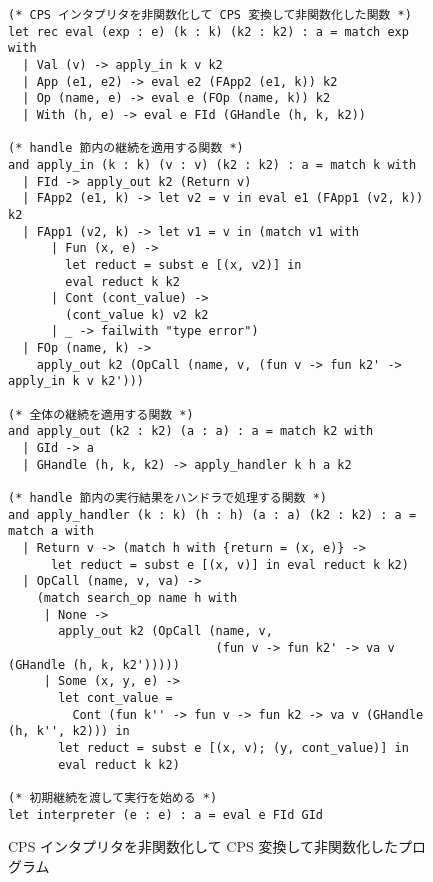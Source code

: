 \begin{figure}
\begin{verbatim}
(* CPS インタプリタを非関数化して CPS 変換して非関数化した関数 *)
let rec eval (exp : e) (k : k) (k2 : k2) : a = match exp with
  | Val (v) -> apply_in k v k2
  | App (e1, e2) -> eval e2 (FApp2 (e1, k)) k2
  | Op (name, e) -> eval e (FOp (name, k)) k2
  | With (h, e) -> eval e FId (GHandle (h, k, k2))

(* handle 節内の継続を適用する関数 *)
and apply_in (k : k) (v : v) (k2 : k2) : a = match k with
  | FId -> apply_out k2 (Return v)
  | FApp2 (e1, k) -> let v2 = v in eval e1 (FApp1 (v2, k)) k2
  | FApp1 (v2, k) -> let v1 = v in (match v1 with
      | Fun (x, e) ->
        let reduct = subst e [(x, v2)] in
        eval reduct k k2
      | Cont (cont_value) ->
        (cont_value k) v2 k2
      | _ -> failwith "type error")
  | FOp (name, k) ->
    apply_out k2 (OpCall (name, v, (fun v -> fun k2' -> apply_in k v k2')))

(* 全体の継続を適用する関数 *)
and apply_out (k2 : k2) (a : a) : a = match k2 with
  | GId -> a
  | GHandle (h, k, k2) -> apply_handler k h a k2

(* handle 節内の実行結果をハンドラで処理する関数 *)
and apply_handler (k : k) (h : h) (a : a) (k2 : k2) : a = match a with
  | Return v -> (match h with {return = (x, e)} ->
      let reduct = subst e [(x, v)] in eval reduct k k2)
  | OpCall (name, v, va) ->
    (match search_op name h with
     | None ->
       apply_out k2 (OpCall (name, v,
                             (fun v -> fun k2' -> va v (GHandle (h, k, k2')))))
     | Some (x, y, e) ->
       let cont_value =
         Cont (fun k'' -> fun v -> fun k2 -> va v (GHandle (h, k'', k2))) in
       let reduct = subst e [(x, v); (y, cont_value)] in
       eval reduct k k2)

(* 初期継続を渡して実行を始める *)
let interpreter (e : e) : a = eval e FId GId
\end{verbatim}
\caption{CPS インタプリタを非関数化して CPS 変換して非関数化したプログラム}
\label{figure:4defun}
\end{figure}

